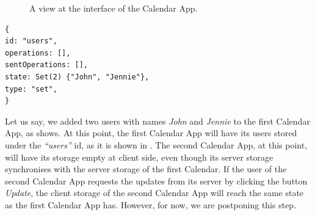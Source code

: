\begin{figure}[!htb]
    \begin{center}
    \setlength{\fboxsep}{4pt}%
    \setlength{\fboxrule}{1pt}%
    {\scriptsize%
     }
    \caption {A view at the interface of the Calendar App.}
    \label{fig:ev-fig-2}
\end{center}
\end{figure}

\begin{lstlisting}[caption={The state of the users object store at the first Calendar App.}, label={lst:ev3}]
{
id: "users",
operations: [],
sentOperations: [],
state: Set(2) {"John", "Jennie"},
type: "set",
}
\end{lstlisting}

Let us say, we added two users with names \textit{John} and \textit{Jennie} to the first Calendar App, as  shows. At this point, the first Calendar App will have its users stored under the \textit{``users''} id, as it is shown in . The second Calendar App, at this point, will have its storage empty at client side, even though its server storage synchronises with the server storage of the first Calendar. If the user of the second Calendar App requests the updates from its server by clicking the button \textit{Update}, the client storage of the second Calendar App will reach the same state as the first Calendar App has. However, for now, we are postponing this step.

